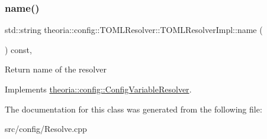 \subsubsection{\texorpdfstring{name()}{name()}}
{\footnotesize\ttfamily std\+::string theoria\+::config\+::\+T\+O\+M\+L\+Resolver\+::\+T\+O\+M\+L\+Resolver\+Impl\+::name (\begin{DoxyParamCaption}{ }\end{DoxyParamCaption}) const\hspace{0.3cm}{\ttfamily [override]}, {\ttfamily [virtual]}}

Return name of the resolver 

Implements \hyperlink{classtheoria_1_1config_1_1ConfigVariableResolver_a026bda729faf988eaef334a45ec92303}{theoria\+::config\+::\+Config\+Variable\+Resolver}.



The documentation for this class was generated from the following file\+:\begin{DoxyCompactItemize}
\item 
src/config/Resolve.\+cpp\end{DoxyCompactItemize}
